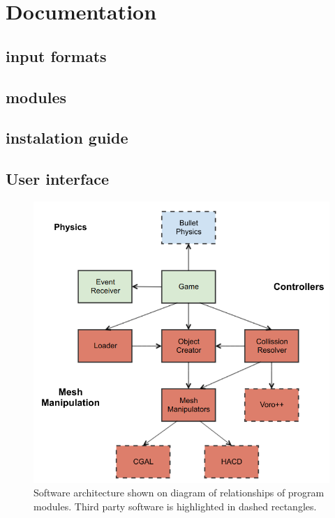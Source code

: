 \chapter{Documentation}

\section{input formats}

\section{modules}

\section{instalation guide}

\section{User interface}

\begin{figure}
        \centering
        \includegraphics[width=\textwidth]{img/objectmodel}
        \caption{Software architecture shown on diagram of relationships of program modules. Third party software is highlighted in dashed rectangles.}
        \label{fig:modules}
\end{figure}